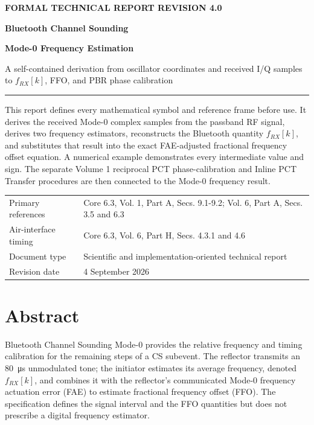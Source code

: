 \documentclass[10pt,a4paper]{article}
\begin{document}
\hypersetup{pageanchor=false}
\begin{titlepage}
\thispagestyle{empty}
\vspace*{13mm}
{\small\bfseries\color{blue} FORMAL TECHNICAL REPORT \hfill REVISION 4.0}\par
\vspace{25mm}
{\Huge\bfseries\color{navy} Bluetooth Channel Sounding\par}
\vspace{3mm}
{\Huge\bfseries\color{navy} Mode-0 Frequency Estimation\par}
\vspace{5mm}
{\Large\color{textgray} A self-contained derivation from oscillator coordinates and received I/Q samples to $f_{RX}[k]$, FFO, and PBR phase calibration}\par
\vspace{14mm}
\rule{\linewidth}{1.1pt}
\vspace{9mm}
{\large
This report defines every mathematical symbol and reference frame before use. It derives the received Mode-0 complex samples from the passband RF signal, derives two frequency estimators, reconstructs the Bluetooth quantity $f_{RX}[k]$, and substitutes that result into the exact FAE-adjusted fractional frequency offset equation. A numerical example demonstrates every intermediate value and sign. The separate Volume 1 reciprocal PCT phase-calibration and Inline PCT Transfer procedures are then connected to the Mode-0 frequency result.\par}
\vfill
\begin{tabular}{@{}ll@{}}
Primary references & Core 6.3, Vol. 1, Part A, Secs. 9.1-9.2; Vol. 6, Part A, Secs. 3.5 and 6.3\\
Air-interface timing & Core 6.3, Vol. 6, Part H, Secs. 4.3.1 and 4.6\\
Document type & Scientific and implementation-oriented technical report\\
Revision date & 4 September 2026
\end{tabular}
\end{titlepage}
\hypersetup{pageanchor=true}

\section*{Abstract}
Bluetooth Channel Sounding Mode-0 provides the relative frequency and timing calibration for the remaining steps of a CS subevent. The reflector transmits an \SI{80}{\micro\second} unmodulated tone; the initiator estimates its average frequency, denoted $f_{RX}[k]$, and combines it with the reflector's communicated Mode-0 frequency actuation error (FAE) to estimate fractional frequency offset (FFO). The specification defines the signal interval and the FFO quantities but does not prescribe a digital frequency estimator.
\end{document}
